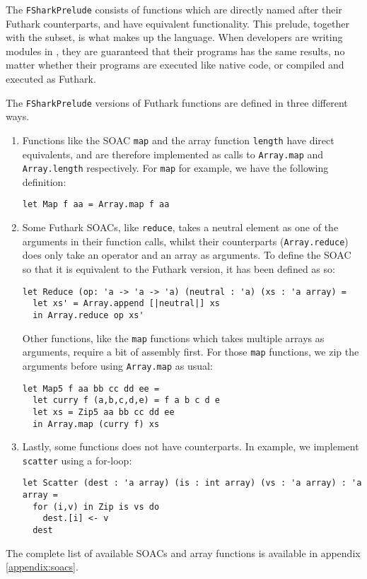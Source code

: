 The \texttt{FSharkPrelude} consists of functions which are directly named after
their Futhark counterparts, and have equivalent functionality.
This prelude, together with the \fshark{} subset, is what makes up the \fshark{} language.
When \fshark{} developers are writing modules in \fshark{}, they are guaranteed
that their \fshark{} programs has the same results, no matter whether their
programs are executed like native \fsharp{} code, or compiled and executed as
Futhark.

The \texttt{FSharkPrelude} versions of Futhark functions are defined in three
different ways.
\begin{enumerate}
  \item Functions like the SOAC \texttt{map} and the array function
    \texttt{length} have direct \fsharp{} equivalents, and are therefore
    implemented as calls to \texttt{Array.map} and \texttt{Array.length}
    respectively.
    For \texttt{map} for example, we have the following definition:
    \begin{verbatim}
let Map f aa = Array.map f aa
    \end{verbatim}

  \item Some Futhark SOACs, like \texttt{reduce}, takes a neutral element as one of the
    arguments in their function calls, whilst their \fsharp{} counterparts
    (\texttt{Array.reduce}) does only take an operator and an array as
    arguments.
    To define the \fshark{} SOAC so that it is equivalent to the Futhark
    version, it has been defined as so:
\begin{verbatim}
let Reduce (op: 'a -> 'a -> 'a) (neutral : 'a) (xs : 'a array) =
  let xs' = Array.append [|neutral|] xs
  in Array.reduce op xs'
\end{verbatim}

    Other functions, like the \texttt{map} functions which takes multiple arrays as
    arguments, require a bit of assembly first. For those \texttt{map} functions,
    we zip the arguments before using \texttt{Array.map} as usual:
\begin{verbatim}
let Map5 f aa bb cc dd ee =
  let curry f (a,b,c,d,e) = f a b c d e
  let xs = Zip5 aa bb cc dd ee
  in Array.map (curry f) xs
\end{verbatim}

    \item Lastly, some functions does not have \fsharp{} counterparts. In
      example, we implement \texttt{scatter} using a for-loop:
\begin{verbatim}
let Scatter (dest : 'a array) (is : int array) (vs : 'a array) : 'a array =
  for (i,v) in Zip is vs do
    dest.[i] <- v
  dest
      \end{verbatim}
\end{enumerate}
The complete list of available SOACs and array functions is available in
appendix \ref{appendix:soacs}.

